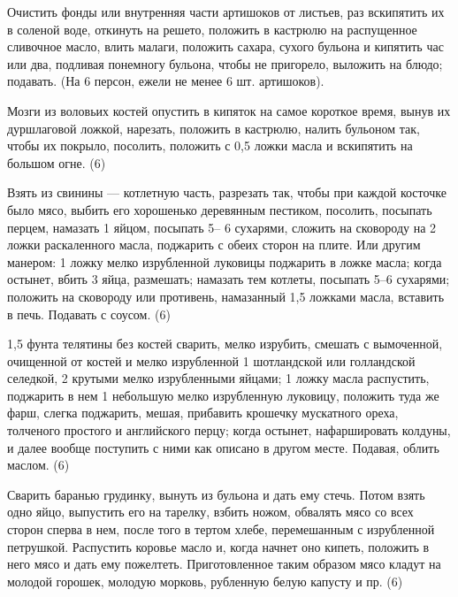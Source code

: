 Очистить фонды или внутренняя части артишоков от листьев, раз вскипятить их в соленой воде, откинуть на решето, положить в кастрюлю на распущенное сливочное масло, влить малаги, положить сахара, сухого бульона и кипятить час или два, подливая понемногу бульона, чтобы не пригорело, выложить на блюдо; подавать. (На 6 персон, ежели не менее 6 шт. артишоков). 


Мозги из воловьих костей опустить в кипяток на самое короткое время, вынув их дуршлаговой ложкой, нарезать, положить в кастрюлю, налить бульоном так, чтобы их покрыло, посолить, положить с 0,5 ложки масла и вскипятить на большом огне. (6) 


Взять из свинины — котлетную часть, разрезать так, чтобы при каждой косточке было мясо, выбить его хорошенько деревянным пестиком, посолить, посыпать перцем, намазать 1 яйцом, посыпать 5-- 6 сухарями, сложить на сковороду на 2 ложки раскаленного масла, поджарить с обеих сторон на плите. Или другим манером: 1 ложку мелко изрубленной луковицы поджарить в ложке масла; когда остынет, вбить 3 яйца, размешать; намазать тем котлеты, посыпать 5--6 сухарями; положить на сковороду или противень, намазанный 1,5 ложками масла, вставить в печь. Подавать с соусом. (6) 


1,5 фунта телятины без костей сварить, мелко изрубить, смешать с вымоченной, очищенной от костей и мелко изрубленной 1 шотландской или голландской селедкой, 2 крутыми мелко изрубленными яйцами; 1 ложку масла распустить, поджарить в нем 1 небольшую мелко изрубленную луковицу, положить туда же фарш, слегка поджарить, мешая, прибавить крошечку мускатного ореха, толченого простого и английского перцу; когда остынет, нафаршировать колдуны, и далее вообще поступить с ними как описано в другом месте. Подавая, облить маслом. (6) 


Сварить баранью грудинку, вынуть из бульона и дать ему стечь. Потом взять одно яйцо, выпустить его на тарелку, взбить ножом, обвалять мясо со всех сторон сперва в нем, после того в тертом хлебе, перемешанным с изрубленной петрушкой. Распустить коровье масло и, когда начнет оно кипеть, положить в него мясо и дать ему пожелтеть. Приготовленное таким образом мясо кладут на молодой горошек, молодую морковь, рубленную белую капусту и пр. (6) 

